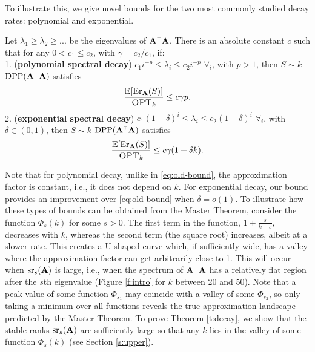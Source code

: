 \documentclass{article}
\begin{document}
To illustrate this, we give novel bounds
for the two most commonly studied decay rates:  polynomial and exponential.
\begin{theorem}\label{t:decay}
Let $\lambda_1\!\geq\!\lambda_2\!\geq\!...$ be the
eigenvalues of $\A^\top\A$. There is an absolute constant $c$ such that
for any $0\!<\!c_1\!\leq\!c_2$, with $\gamma=c_2/c_1$, if:\\[2mm]
\textnormal{1.} (\textbf{polynomial spectral decay}) $c_1i^{-p}\!\leq\!
  \lambda_i\!\leq\! c_2i^{-p}$ $\forall_i$, with $p>1$, then $S\sim
k$-$\DPP(\A^\top\A)$ satisfies
  \begin{align*}
    \frac{\mathbb E[\mathrm{Er}_\mathbf A(S)]}{{\textsc{OPT}_k}}\leq c \gamma p. 
  \end{align*}
\textnormal{2.} (\textbf{exponential spectral decay}) $c_1(1\!-\!\delta)^{i}\leq \lambda_i\leq
  c_2(1\!-\!\delta)^{i}$ $\forall_i$, with $\delta\in(0,1)$, then $S\sim
k$-$\DPP(\A^\top\A)$ satisfies
  \begin{align*}
    \frac{\mathbb E[\mathrm{Er}_\mathbf A(S)]}{{\textsc{OPT}_k}}\leq c\gamma(1+ \delta k).
  \end{align*}
\end{theorem}
Note that for polynomial decay, unlike in \eqref{eq:old-bound}, the
approximation factor is constant, i.e., it does not depend on $k$. For
exponential decay, our bound provides an improvement over
\eqref{eq:old-bound} when $\delta=o(1)$.
To illustrate how these types of bounds can be obtained from the
Master Theorem, consider the function $\Phi_s(k)$ for some
$s>0$. The first term in the function, $1+\frac{s}{k-s}$, decreases with $k$, whereas
the second term (the square root) increases, albeit at a slower rate. This creates a
U-shaped curve which, if sufficiently wide, has a valley where the
approximation factor can get arbitrarily close to 1. This will occur
when ${\mathrm{sr}}_s(\mathbf A)$ is large, i.e., when the spectrum of $\A^\top\A$ has
a relatively flat region after the $s$th eigenvalue (Figure \ref{f:intro}
for $k$ between 20 and 50). Note that a peak value of some function
$\Phi_{s_1}$ may coincide with a valley of some $\Phi_{s_2}$, so only
taking a minimum over all functions reveals the true approximation
landscape predicted by the Master Theorem. To prove Theorem
\ref{t:decay}, we show that the stable ranks ${\mathrm{sr}}_s(\mathbf A)$ are
sufficiently large so that any $k$ lies in  the valley of some
function $\Phi_s(k)$ (see Section \ref{s:upper}).
\end{document}
